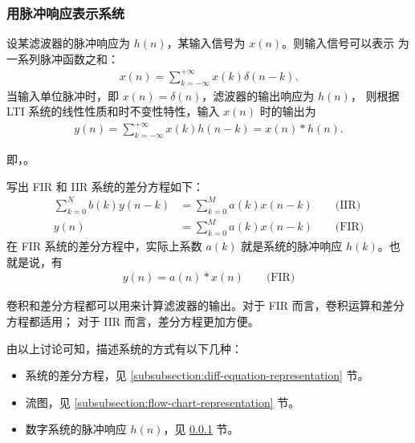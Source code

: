 \subsubsection{用脉冲响应表示系统}

\label{subsubsection:pulse-response-representation}

\begin{theorem}
    设某滤波器的脉冲响应为 $h(n)$，某输入信号为 $x(n)$。则输入信号可以表示
    为一系列脉冲函数之和：
    \begin{align*}
        x(n) = \sum_{k = -\infty}^{+\infty}x(k)\delta(n - k).
    \end{align*}
    当输入单位脉冲时，即 $x(n) = \delta(n)$，滤波器的输出响应为 $h(n)$，
    则根据 LTI 系统的线性性质和时不变性特性，输入 $x(n)$ 时的输出为
    \begin{align*}
        y(n) = \sum_{k = -\infty}^{+\infty}x(k)h(n - k) = x(n) * h(n).
    \end{align*}
    
    即，。
\end{theorem}

\begin{property}[差分方程与卷积运算]
    \label{property:diff-equation-convolution}
    写出 FIR 和 IIR 系统的差分方程如下：
    \begin{align*}
        \sum_{k = 0}^{N}b(k)y(n - k) & = \sum_{k = 0}^{M}a(k)x(n - k) \qquad \text{(IIR)} \\
        y(n) & = \sum_{k = 0}^{M}a(k)x(n - k) \qquad \text{(FIR)}
    \end{align*}
    在 FIR 系统的差分方程中，实际上系数 $a(k)$ 就是系统的脉冲响应 $h(k)$。也就是说，有
    \begin{align*}
        y(n) = a(n) * x(n) \qquad \text{(FIR)}
    \end{align*}

    卷积和差分方程都可以用来计算滤波器的输出。对于 FIR 而言，卷积运算和差分方程都适用；
    对于 IIR 而言，差分方程更加方便。
\end{property}

\begin{remark}
    由以上讨论可知，描述系统的方式有以下几种：
    \begin{itemize}
        \item 系统的差分方程，见 \ref{subsubsection:diff-equation-representation} 节。
        \item 流图，见 \ref{subsubsection:flow-chart-representation} 节。
        \item 数字系统的脉冲响应 $h(n)$，见 \ref{subsubsection:pulse-response-representation} 节。
    \end{itemize}
\end{remark}

